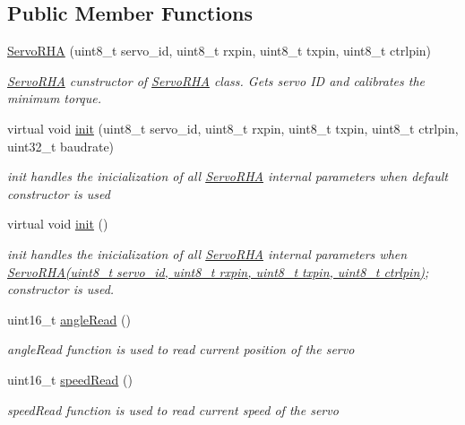 \subsection*{Public Member Functions}
\begin{DoxyCompactItemize}
\item 
\hyperlink{classServoRHA_a7fb72168b35039c5b1eb1597312e8303}{Servo\+R\+HA} (uint8\+\_\+t servo\+\_\+id, uint8\+\_\+t rxpin, uint8\+\_\+t txpin, uint8\+\_\+t ctrlpin)
\begin{DoxyCompactList}\small\item\em \hyperlink{classServoRHA}{Servo\+R\+HA} cunstructor of \hyperlink{classServoRHA}{Servo\+R\+HA} class. Gets servo ID and calibrates the minimum torque. \end{DoxyCompactList}\item 
virtual void \hyperlink{classServoRHA_a3cc8f36d2756e5a196ec13e12f1a2286}{init} (uint8\+\_\+t servo\+\_\+id, uint8\+\_\+t rxpin, uint8\+\_\+t txpin, uint8\+\_\+t ctrlpin, uint32\+\_\+t baudrate)
\begin{DoxyCompactList}\small\item\em init handles the inicialization of all \hyperlink{classServoRHA}{Servo\+R\+HA} internal parameters when default constructor is used \end{DoxyCompactList}\item 
virtual void \hyperlink{classServoRHA_abd64398a4d18799952561bd7a5ded082}{init} ()
\begin{DoxyCompactList}\small\item\em init handles the inicialization of all \hyperlink{classServoRHA}{Servo\+R\+HA} internal parameters when \hyperlink{classServoRHA_a7fb72168b35039c5b1eb1597312e8303}{Servo\+R\+H\+A(uint8\+\_\+t servo\+\_\+id, uint8\+\_\+t rxpin, uint8\+\_\+t txpin, uint8\+\_\+t ctrlpin)}; constructor is used. \end{DoxyCompactList}\item 
uint16\+\_\+t \hyperlink{classServoRHA_a6e21d764f228195d3be465495fe78390}{angle\+Read} ()
\begin{DoxyCompactList}\small\item\em angle\+Read function is used to read current position of the servo \end{DoxyCompactList}\item 
uint16\+\_\+t \hyperlink{classServoRHA_ac0d004c22090d5a75facc319f8773fc0}{speed\+Read} ()
\begin{DoxyCompactList}\small\item\em speed\+Read function is used to read current speed of the servo \end{DoxyCompactList}\item 

\end{DoxyCompactItemize}
